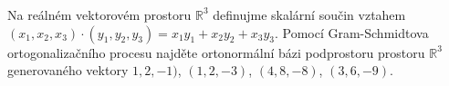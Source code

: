 \subsubsection{}
Na reálném vektorovém prostoru $\mathbb{R}^3$ definujme skalární součin vztahem
$(x_1, x_2, x_3) \cdot (y_1, y_2, y_3) = x_1 y_1 + x_2 y_2 + x_3 y_3$. Pomocí
Gram-Schmidtova ortogonalizačního procesu najděte ortonormální bázi podprostoru
prostoru $\mathbb{R}^3$ generovaného vektory $1,2,-1)$, $(1,2,-3)$, $(4,8,-8)$, $(3,6,-9)$.
